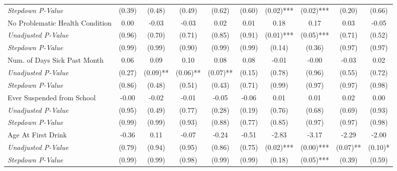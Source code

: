 \begin{tabular}{l c c c c c c c c c}
\quad \textit{Stepdown P-Value} & (0.39) & (0.48) & (0.49) & (0.62) & (0.60) & (0.02)*** & (0.02)*** & (0.20) & (0.66) \\
No Problematic Health Condition & 0.00 & -0.03 & -0.03 & 0.02 & 0.01 & 0.18 & 0.17 & 0.03 & -0.05 \\
\quad \textit{Unadjusted P-Value} & (0.96) & (0.70) & (0.71) & (0.85) & (0.91) & (0.01)*** & (0.05)*** & (0.71) & (0.52) \\
\quad \textit{Stepdown P-Value} & (0.99) & (0.99) & (0.90) & (0.99) & (0.99) & (0.14) & (0.36) & (0.97) & (0.97) \\
Num. of Days Sick Past Month & 0.06 & 0.09 & 0.10 & 0.08 & 0.08 & -0.01 & -0.00 & -0.03 & 0.02 \\
\quad \textit{Unadjusted P-Value} & (0.27) & (0.09)** & (0.06)** & (0.07)** & (0.15) & (0.78) & (0.96) & (0.55) & (0.72) \\
\quad \textit{Stepdown P-Value} & (0.86) & (0.48) & (0.51) & (0.43) & (0.71) & (0.99) & (0.97) & (0.97) & (0.98) \\
Ever Suspended from School & -0.00 & -0.02 & -0.01 & -0.05 & -0.06 & 0.01 & 0.01 & 0.02 & 0.00 \\
\quad \textit{Unadjusted P-Value} & (0.95) & (0.49) & (0.77) & (0.28) & (0.19) & (0.76) & (0.68) & (0.69) & (0.93) \\
\quad \textit{Stepdown P-Value} & (0.99) & (0.99) & (0.93) & (0.88) & (0.77) & (0.85) & (0.97) & (0.97) & (0.98) \\
Age At First Drink & -0.36 & 0.11 & -0.07 & -0.24 & -0.51 & -2.83 & -3.17 & -2.29 & -2.00 \\
\quad \textit{Unadjusted P-Value} & (0.79) & (0.94) & (0.95) & (0.86) & (0.75) & (0.02)*** & (0.00)*** & (0.07)** & (0.10)* \\
\quad \textit{Stepdown P-Value} & (0.99) & (0.99) & (0.98) & (0.99) & (0.99) & (0.18) & (0.05)*** & (0.39) & (0.59) \\
\bottomrule
\end{tabular}
